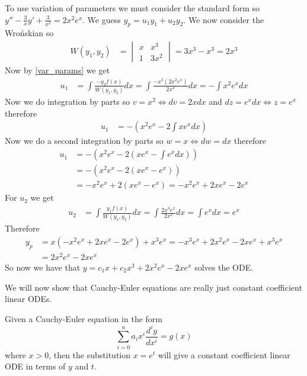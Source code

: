 \documentclass[notes]{subfiles}
\begin{document}
\begin{solution}
    To use variation of parameters we must consider the standard form so $y'' - \frac{3}{x}y' + \frac{3}{x^2} = 2x^2e^x$. We guess $y_p = u_1y_1 + u_2y_2$. We now consider the Wro\'nskian so
    \begin{align*}
        W(y_1, y_2)
        &= \begin{vmatrix}
            x & x^3 \\
            1 & 3x^2
        \end{vmatrix}
        = 3x^3 - x^3 = 2x^3
    \end{align*}
    Now by \eqref{var_params} we get
    \begin{align*}
        u_1
        &= \int \frac{-y_2f(x)}{W(y_1, y_2)} dx
        = \int \frac{-x^3(2x^2 e^x)}{2x^3} dx
        = -\int x^2e^x dx
    \end{align*}
    Now we do integration by parts so $v = x^2 \iff dv = 2xdx$ and $dz = e^xdx \iff z = e^x$ therefore
    \begin{align*}
        u_1
        &= -\left( x^2e^x - 2\int xe^x dx \right)
    \end{align*}
    Now we do a second integration by parts so $w = x \iff dw = dx$ therefore
    \begin{align*}
        u_1
        &= -\left( x^2e^x - 2\left( xe^x - \int e^x dx \right) \right) \\
        &= -\left( x^2e^x - 2\left( xe^x - e^x \right) \right) \\
        &= -x^2e^x + 2\left( xe^x - e^x \right)
        = -x^2e^x + 2xe^x - 2e^x
    \end{align*}
    For $u_2$ we get
    \begin{align*}
        u_2
        &= \int \frac{y_1f(x)}{W(y_1, y_2)} dx
        = \int \frac{2x^3e^x}{2x^3} dx
        = \int e^x dx
        = e^x
    \end{align*}
    Therefore
    \begin{align*}
        y_p
        &= x(-x^2e^x + 2xe^x - 2e^x) + x^3e^x
        = -x^3e^x + 2x^2e^x - 2xe^x + x^3e^x \\
        &= 2x^2e^x - 2xe^x
    \end{align*}
    So now we have that $y = c_1x + c_2x^3 + 2x^2e^x - 2xe^x$ solves the ODE.
\end{solution}

We will now show that Cauchy-Euler equations are really just constant coefficient linear ODEs.

\begin{theorem}
    Given a Cauchy-Euler equation in the form
    \[
        \sum_{i = 0}^n a_i x^i \frac{d^iy}{dx^i} = g(x)
    \]
    where $x > 0$, then the substitution $x = e^t$ will give a constant coefficient linear ODE in terms of $y$ and $t$.
\end{theorem}
\end{document}
